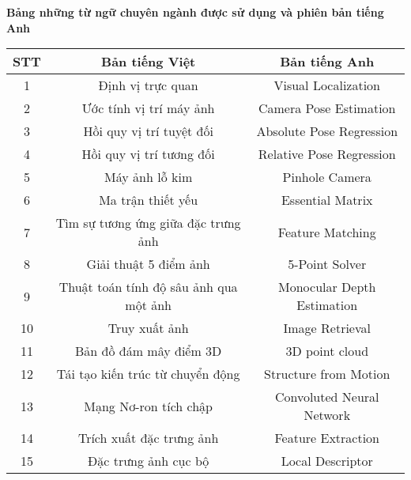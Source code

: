 \titlepage \null
	\small
	\begin{center}
	  {\bfseries Bảng những từ ngữ chuyên ngành được sử dụng và phiên bản tiếng Anh\vspace{-.5em}}
	\end{center}
	\quotation
\begin{table}[h]
\centering
\begin{tabular}{|c|c|c|}
\hline
\textbf{STT} & \textbf{Bản tiếng Việt}                & \textbf{Bản tiếng Anh}     \\ \hline
1            & Định vị trực quan                  & Visual Localization        \\ \hline
2            & Ước tính vị trí máy ảnh                & Camera Pose Estimation     \\ \hline
3            & Hồi quy vị trí tuyệt đối               & Absolute Pose Regression   \\ \hline
4            & Hồi quy vị trí tương đối               & Relative Pose Regression   \\ \hline
5            & Máy ảnh lỗ kim                         & Pinhole Camera             \\ \hline
6            & Ma trận thiết yếu                      & Essential Matrix           \\ \hline
7            & Tìm sự tương ứng giữa đặc trưng ảnh    & Feature Matching           \\ \hline
8            & Giải thuật 5 điểm ảnh                  & 5-Point Solver             \\ \hline
9            & Thuật toán tính độ sâu ảnh qua một ảnh & Monocular Depth Estimation \\ \hline
10           & Truy xuất ảnh                          & Image Retrieval            \\ \hline
11           & Bản đồ đám mây điểm 3D                          & 3D point cloud            \\ \hline
12           & Tái tạo kiến trúc từ chuyển động                          & Structure from Motion            \\ \hline
13           & Mạng Nơ-ron tích chập                         & Convoluted Neural Network           \\ \hline
14           & Trích xuất đặc trưng ảnh                         & Feature Extraction           \\ \hline
15           & Đặc trưng ảnh cục bộ                         & Local Descriptor           \\ \hline

\end{tabular}
\end{table}

